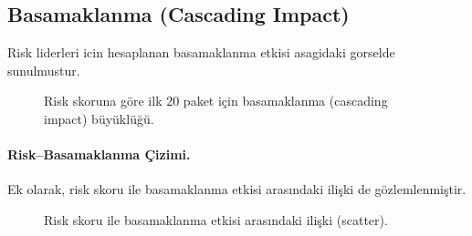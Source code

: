 \documentclass[11pt,a4paper]{article}
\begin{document}
\subsection{Basamaklanma (Cascading Impact)}
Risk liderleri icin hesaplanan basamaklanma etkisi asagidaki gorselde sunulmustur.
\begin{figure}[h]
  \centering
  \caption{Risk skoruna g\"ore ilk 20 paket i\c{c}in basamaklanma (cascading impact) b\"uy\"ukl\"u\u{g}\u{u}.}
\end{figure}

\paragraph{Risk--Basamaklanma \c{C}izimi.} Ek olarak, risk skoru ile basamaklanma etkisi aras\i ndaki ili\c{s}ki de g\"ozlemlenmi\c{s}tir.
\begin{figure}[h]
  \centering
  \caption{Risk skoru ile basamaklanma etkisi aras\i ndaki ili\c{s}ki (scatter).}
\end{figure}
\end{document}
